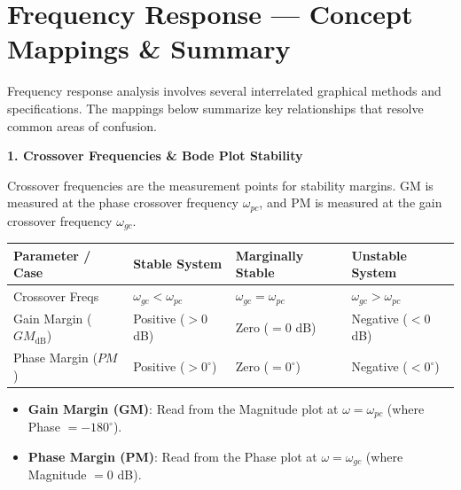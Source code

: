 \documentclass[12pt,a4paper]{article}
\renewcommand{\arraystretch}{1.45}
\begin{document}
\section{Frequency Response --- Concept Mappings \& Summary}

\begingroup
\small
\renewcommand{\arraystretch}{1.3}
\setlength{\parskip}{4.5pt}

Frequency response analysis involves several interrelated graphical methods and specifications. The mappings below summarize key relationships that resolve common areas of confusion.

\par\vspace{10pt}\noindent
\textbf{1. Crossover Frequencies \& Bode Plot Stability}
\par\vspace{3pt}\noindent
Crossover frequencies are the measurement points for stability margins. GM is measured at the phase crossover frequency $\omega_{pc}$, and PM is measured at the gain crossover frequency $\omega_{gc}$.

\par\vspace{5pt}\noindent
\begin{tabularx}{\linewidth}{|B{3.2cm}|>{\centering\arraybackslash}X|>{\centering\arraybackslash}X|>{\centering\arraybackslash}X|}
\hline
{}
\textbf{\color{myred}Parameter / Case} & \textbf{\color{mygreen}Stable System} & \textbf{\color{myamber}Marginally Stable} & \textbf{\color{myred}Unstable System} \\
\hline
Crossover Freqs & $\omega_{gc} < \omega_{pc}$ & $\omega_{gc} = \omega_{pc}$ & $\omega_{gc} > \omega_{pc}$ \\
\hline
Gain Margin ($GM_{\text{dB}}$) & Positive ($>0$ dB) & Zero ($=0$ dB) & Negative ($<0$ dB) \\
\hline
Phase Margin ($PM$) & Positive ($>0^\circ$) & Zero ($=0^\circ$) & Negative ($<0^\circ$) \\
\hline
\end{tabularx}

\par\vspace{6pt}
\begin{tcolorbox}[examplebox, title={\textbf{Critical Rules for Crossover Measurements}}, top=3pt, bottom=3pt, left=8pt, right=8pt]
\begin{itemize}[leftmargin=*, itemsep=2pt, topsep=1pt, parsep=0pt]
  \item \textbf{Gain Margin (GM)}: Read from the Magnitude plot at $\omega = \omega_{pc}$ (where Phase $= -180^\circ$).
  \item \textbf{Phase Margin (PM)}: Read from the Phase plot at $\omega = \omega_{gc}$ (where Magnitude $= 0$ dB).
\end{itemize}
\end{tcolorbox}
\end{document}
